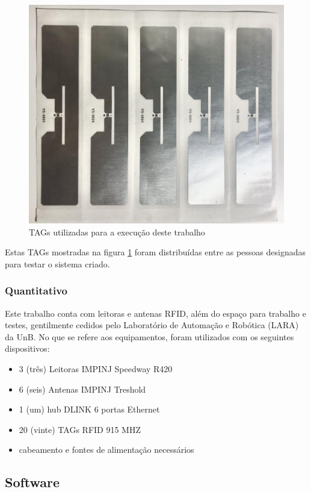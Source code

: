  \begin{figure}[H]
    \centering
    \includegraphics[width=0.8\linewidth]{figs/Metodologia/TAGsRFID.jpeg}
    \caption{TAGs utilizadas para a execução deste trabalho}
    \label{fig:TAGsused}
\end{figure}
 
 Estas TAGs mostradas na figura \ref{fig:TAGsused} foram distribuídas entre as pessoas designadas para testar o sistema criado.
 
 \subsubsection{Quantitativo}
 
 Este trabalho conta com leitoras e antenas RFID, além do espaço para trabalho e testes, gentilmente cedidos pelo Laboratório de Automação e Robótica (LARA) da UnB. No que se refere aos equipamentos, foram utilizados com os seguintes dispositivos:
 
 \begin{itemize}
     \item 3 (três) Leitoras IMPINJ Speedway R420
     \item 6 (seis) Antenas IMPINJ Treshold
     \item 1 (um) hub DLINK 6 portas Ethernet
     \item 20 (vinte) TAGs RFID 915 MHZ
     \item cabeamento e fontes de alimentação necessários
 \end{itemize}
 
 \subsection{Software}
 
